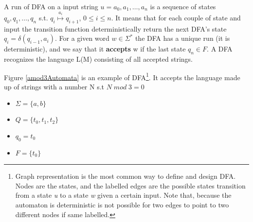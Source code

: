 A run of DFA on a input string $u = a_0,a_1,\ldots,a_n$ is a
sequence of states \\ $ q_0,q_1,\ldots,q_n$ s.t.
$q_i  \overset{a_i}{\longmapsto} q_{i+1} $,
$ 0 \leq i \le n$. It means that for each couple of state
and input the transition function deterministically return the next DFA's
state \\ $q_i=\delta(q_{i-1},a_{i}) $.
For a given word $\textit{w}\in \Sigma^* $ the DFA has a
unique run (it is deterministic), and we say that it \textbf{accepts} w if the
last state $q_n \in F $. A DFA recognizes the
language L(M) consisting of all accepted strings.


Figure \ref{amod3Automata} is an example of DFA\footnote{Graph representation
is the most common way to define and design DFA. Nodes are the states, and
the labelled edges are the possible states transition from a state \textit{u}
to a state \textit{w} given a certain input.
Note that, because the automaton is deterministic is not possible for two
edges to point to two different nodes if same labelled.}.
It accepts the language made up of strings with a number N s.t $N
\;mod\; 3 = 0 $
\begin{itemize}
  \item$ \Sigma = \{a,b\}$
  \item $ Q = \{t_0,t_1,t_2\}$
  \item $ q_0 = t_0$
  \item $ F = \{t_0\} $
\end{itemize}


